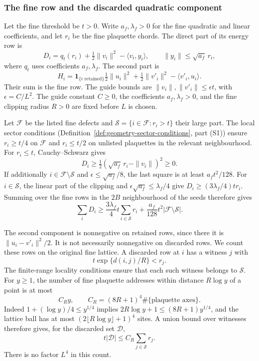 \subsubsection{The fine row and the discarded quadratic component}
Let the fine threshold be $t>0$. Write $a_f,\lambda_f>0$ for the fine
quadratic and linear coefficients, and let $r_i$ be the fine plaquette
chords. The direct part of its energy row is
\[
 D_i=q_t(r_i)+\tfrac12\|v_i\|^2-\langle v_i,y_i\rangle,
 \qquad \|y_i\|\le\sqrt{a_f}\,r_i,
\]
where $q_t$ uses coefficients $a_f,\lambda_f$. The second part is
\[
 H_i=\mathbf1_{\{i\text{ retained}\}}\tfrac12\|u_i\|^2
       +\tfrac12\|v'_i\|^2-\langle v'_i,u_i\rangle.
\]
Their sum is the fine row. The guide bounds are
$\|v_i\|,\|v'_i\|\le\epsilon t$, with
$\epsilon=C/L^2$. The guide constant $C\ge0$, the coefficients $a_f,\lambda_f>0$,
and the fine clipping radius $R>0$ are fixed before $L$ is chosen.

Let $\mathcal F$ be the listed fine defects and
$\mathcal S=\{i\in\mathcal F:r_i>t\}$ their large part. The local
sector conditions (Definition~\ref{def:geometry-sector-conditions},
part (S1)) ensure $r_i\ge t/4$ on $\mathcal F$ and
$r_i\le t/2$ on unlisted plaquettes in the relevant neighbourhood.
For $r_i\le t$, Cauchy--Schwarz gives
\[
 D_i\ge\tfrac12(\sqrt{a_f}\,r_i-\|v_i\|)^2\ge0.
\]
If additionally $i\in\mathcal F\setminus\mathcal S$ and
$\epsilon\le\sqrt{a_f}/8$, the last square is at least
$a_ft^2/128$. For $i\in\mathcal S$, the linear part of the clipping
and $\epsilon\sqrt{a_f}\le\lambda_f/4$ give
$D_i\ge(3\lambda_f/4)tr_i$. Summing over the fine rows in the
$2B$ neighbourhood of the seeds therefore gives
\begin{equation}\label{eq:seed-direct-income}
 \sum_i D_i\ge \frac{3\lambda_f}{4}t\sum_{i\in\mathcal S}r_i
             +\frac{a_f}{128}t^2|\mathcal F\setminus\mathcal S|.
\end{equation}

The second component is nonnegative on retained rows, since there it
is $\|u_i-v'_i\|^2/2$. It is not necessarily nonnegative on discarded
rows. We count these rows on the original fine lattice. A discarded
row at $i$ has a witness $j$ with
\[
 t\exp\{d(i,j)/R\}<r_j.
\]
The finite-range locality conditions ensure that each such witness
belongs to $\mathcal S$. For $y\ge1$, the number of fine plaquette
addresses within distance $R\log y$ of a point is at most
\[
 C_R y,\qquad C_R=(8R+1)^4\#\{\text{plaquette axes}\}.
\]
Indeed $1+(\log y)/4\le y^{1/4}$ implies
$2R\log y+1\le(8R+1)y^{1/4}$, and the lattice ball has at most
$(2\lfloor R\log y\rfloor+1)^4$ sites. A union bound over witnesses
therefore gives, for the discarded set $\mathcal D$,
\begin{equation}\label{eq:seed-discarded-count}
 t|\mathcal D|\le C_R\sum_{j\in\mathcal S}r_j.
\end{equation}
There is no factor $L^4$ in this count.

